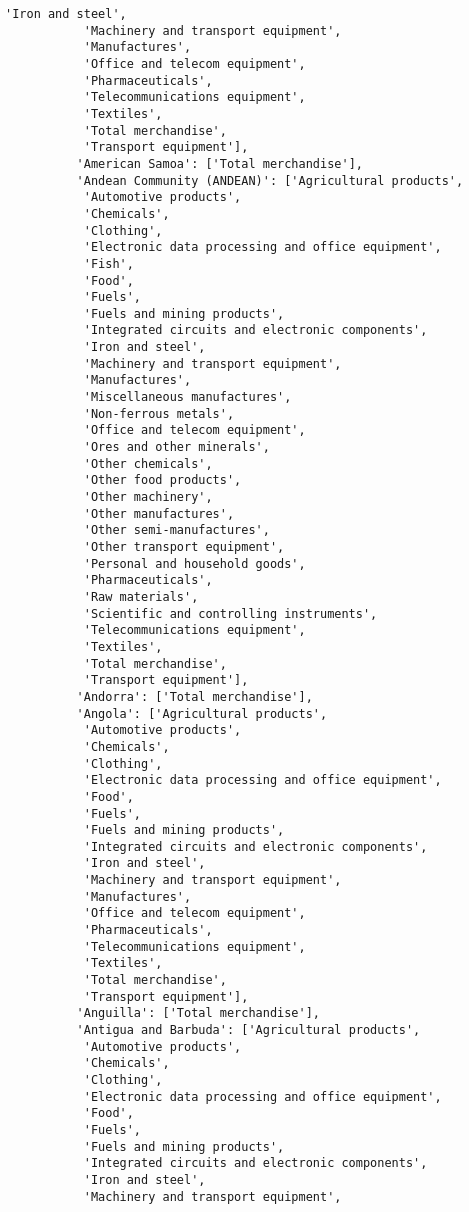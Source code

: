 \documentclass[11pt]{article}
\begin{document}
\begin{Verbatim}[commandchars=\\\{\}]
           'Iron and steel',
           'Machinery and transport equipment',
           'Manufactures',
           'Office and telecom equipment',
           'Pharmaceuticals',
           'Telecommunications equipment',
           'Textiles',
           'Total merchandise',
           'Transport equipment'],
          'American Samoa': ['Total merchandise'],
          'Andean Community (ANDEAN)': ['Agricultural products',
           'Automotive products',
           'Chemicals',
           'Clothing',
           'Electronic data processing and office equipment',
           'Fish',
           'Food',
           'Fuels',
           'Fuels and mining products',
           'Integrated circuits and electronic components',
           'Iron and steel',
           'Machinery and transport equipment',
           'Manufactures',
           'Miscellaneous manufactures',
           'Non-ferrous metals',
           'Office and telecom equipment',
           'Ores and other minerals',
           'Other chemicals',
           'Other food products',
           'Other machinery',
           'Other manufactures',
           'Other semi-manufactures',
           'Other transport equipment',
           'Personal and household goods',
           'Pharmaceuticals',
           'Raw materials',
           'Scientific and controlling instruments',
           'Telecommunications equipment',
           'Textiles',
           'Total merchandise',
           'Transport equipment'],
          'Andorra': ['Total merchandise'],
          'Angola': ['Agricultural products',
           'Automotive products',
           'Chemicals',
           'Clothing',
           'Electronic data processing and office equipment',
           'Food',
           'Fuels',
           'Fuels and mining products',
           'Integrated circuits and electronic components',
           'Iron and steel',
           'Machinery and transport equipment',
           'Manufactures',
           'Office and telecom equipment',
           'Pharmaceuticals',
           'Telecommunications equipment',
           'Textiles',
           'Total merchandise',
           'Transport equipment'],
          'Anguilla': ['Total merchandise'],
          'Antigua and Barbuda': ['Agricultural products',
           'Automotive products',
           'Chemicals',
           'Clothing',
           'Electronic data processing and office equipment',
           'Food',
           'Fuels',
           'Fuels and mining products',
           'Integrated circuits and electronic components',
           'Iron and steel',
           'Machinery and transport equipment',

\end{Verbatim}
\end{document}
